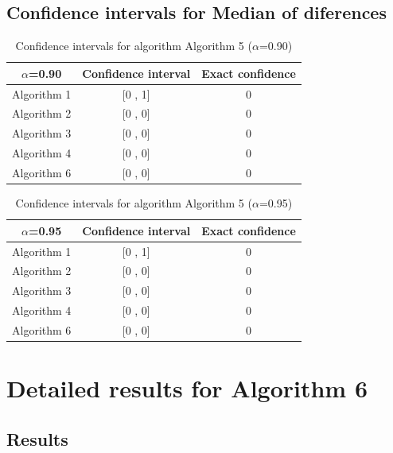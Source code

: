 \documentclass[a4paper,10pt]{article}
\begin{document}
\subsection{Confidence intervals for Median of diferences}

\begin{table}[!htp]
\centering\small
\begin{tabular}{
|c|c|c|}
\hline
 $\alpha$=0.90 & Confidence interval & Exact confidence \\ \hline 
Algorithm 1 & [0 , 1] & 0\\ \hline 
Algorithm 2 & [0 , 0] & 0\\ \hline 
Algorithm 3 & [0 , 0] & 0\\ \hline 
Algorithm 4 & [0 , 0] & 0\\ \hline 
Algorithm 6 & [0 , 0] & 0\\ \hline 

\end{tabular}
\caption{Confidence intervals for algorithm Algorithm 5 ($\alpha$=0.90)}
\end{table}
\begin{table}[!htp]
\centering\small
\begin{tabular}{
|c|c|c|}
\hline
 $\alpha$=0.95 & Confidence interval & Exact confidence \\ \hline 
Algorithm 1 & [0 , 1] & 0\\ \hline 
Algorithm 2 & [0 , 0] & 0\\ \hline 
Algorithm 3 & [0 , 0] & 0\\ \hline 
Algorithm 4 & [0 , 0] & 0\\ \hline 
Algorithm 6 & [0 , 0] & 0\\ \hline 

\end{tabular}
\caption{Confidence intervals for algorithm Algorithm 5 ($\alpha$=0.95)}
\end{table}

 \clearpage 


\section{Detailed results for Algorithm 6}


\subsection{Results}
\end{document}
